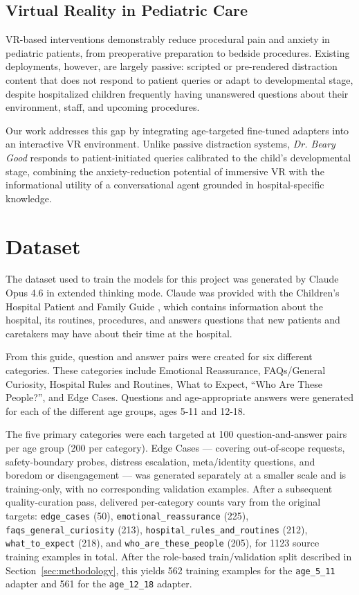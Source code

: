 \documentclass[AMA,Times1COL]{WileyNJDv5} %
\begin{document}
\subsection{Virtual Reality in Pediatric Care}

VR-based interventions demonstrably reduce procedural pain and anxiety in pediatric patients, from preoperative preparation to bedside procedures. Existing deployments, however, are largely passive: scripted or pre-rendered distraction content that does not respond to patient queries or adapt to developmental stage, despite hospitalized children frequently having unanswered questions about their environment, staff, and upcoming procedures.

Our work addresses this gap by integrating age-targeted fine-tuned adapters into an interactive VR environment. Unlike passive distraction systems, \textit{Dr. Beary Good} responds to patient-initiated queries calibrated to the child's developmental stage, combining the anxiety-reduction potential of immersive VR with the informational utility of a conversational agent grounded in hospital-specific knowledge.

\section{Dataset}\label{sec3}

The dataset used to train the models for this project was generated by Claude Opus 4.6 in extended thinking mode. Claude was provided with the Children's Hospital Patient and Family Guide \cite{hospitalguide}, which contains information about the hospital, its routines, procedures, and answers questions that new patients and caretakers may have about their time at the hospital.

From this guide, question and answer pairs were created for six different categories. These categories include Emotional Reassurance, FAQs/General Curiosity, Hospital Rules and Routines, What to Expect, ``Who Are These People?'', and Edge Cases. Questions and age-appropriate answers were generated for each of the different age groups, ages 5-11 and 12-18.

The five primary categories were each targeted at 100 question-and-answer pairs per age group (200 per category). Edge Cases --- covering out-of-scope requests, safety-boundary probes, distress escalation, meta/identity questions, and boredom or disengagement --- was generated separately at a smaller scale and is training-only, with no corresponding validation examples. After a subsequent quality-curation pass, delivered per-category counts vary from the original targets: \texttt{edge\_cases} (50), \texttt{emotional\_reassurance} (225), \texttt{faqs\_general\_curiosity} (213), \texttt{hospital\_rules\_and\_routines} (212), \texttt{what\_to\_expect} (218), and \texttt{who\_are\_these\_people} (205), for 1123 source training examples in total. After the role-based train/validation split described in Section~\ref{sec:methodology}, this yields 562 training examples for the \texttt{age\_5\_11} adapter and 561 for the \texttt{age\_12\_18} adapter.
\end{document}
